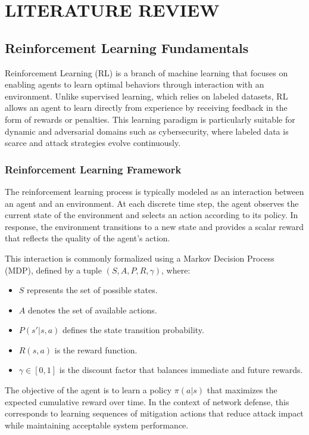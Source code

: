 \documentclass[12pt,a4paper]{report}
\begin{document}
\chapter{LITERATURE REVIEW}
\section{Reinforcement Learning Fundamentals}

Reinforcement Learning (RL) is a branch of machine learning that focuses on enabling agents to learn optimal behaviors through interaction with an environment.
Unlike supervised learning, which relies on labeled datasets, RL allows an agent to learn directly from experience by receiving feedback in the form of rewards or penalties.
This learning paradigm is particularly suitable for dynamic and adversarial domains such as cybersecurity, where labeled data is scarce and attack strategies evolve continuously.

\subsection{Reinforcement Learning Framework}

The reinforcement learning process is typically modeled as an interaction between an agent and an environment.
At each discrete time step, the agent observes the current state of the environment and selects an action according to its policy.
In response, the environment transitions to a new state and provides a scalar reward that reflects the quality of the agent’s action.

This interaction is commonly formalized using a Markov Decision Process (MDP), defined by a tuple $(S, A, P, R, \gamma)$, where:
\begin{itemize}
    \item $S$ represents the set of possible states.
    \item $A$ denotes the set of available actions.
    \item $P(s'|s,a)$ defines the state transition probability.
    \item $R(s,a)$ is the reward function.
    \item $\gamma \in [0,1]$ is the discount factor that balances immediate and future rewards.
\end{itemize}

The objective of the agent is to learn a policy $\pi(a|s)$ that maximizes the expected cumulative reward over time.
In the context of network defense, this corresponds to learning sequences of mitigation actions that reduce attack impact while maintaining acceptable system performance.
\end{document}
